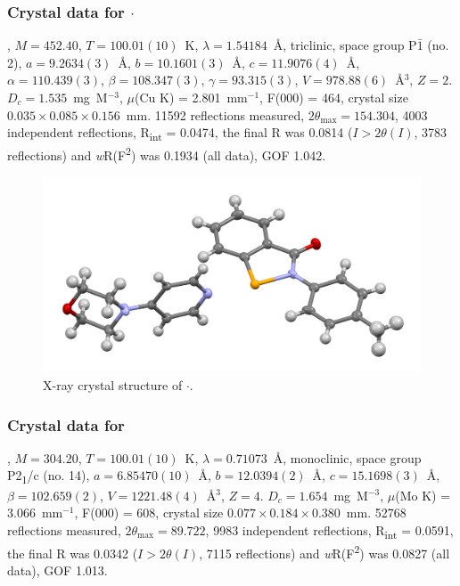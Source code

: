 \begin{refsection}
\subsubsection{Crystal data for \texorpdfstring{$ \cdot $}{C23 H23 N3 O2 Se}}
, $M=452.40$, $T=100.01(10)$~K, $\lambda=1.54184$~\AA, triclinic, space group P$\bar{1}$ (no. 2), $a = 9.2634(3)$~\AA, $b = 10.1601(3)$~\AA, $c = 11.9076(4)$~\AA, $\alpha = 110.439(3)$\degree, $\beta = 108.347(3)$\degree, $\gamma = 93.315(3)$\degree, $V = 978.88(6)$~\AA$^{3}$, $Z = 2$. $D_{c}= 1.535$~mg~M$^{-3}$, $\mu$(Cu K\a) = 2.801~mm$^{-1}$, F(000) = 464, crystal size $0.035 \times 0.085 \times 0.156$~mm. 11592 reflections measured, $2\theta_{\max}=154.304$\degree, 4003 independent reflections, R\textsubscript{int} = 0.0474, the final R was 0.0814 ($I > 2\theta(I)$, 3783 reflections) and \textit{w}R(F\textsuperscript{2}) was 0.1934 (all data), GOF 1.042.

\begin{figure}
  \includegraphics[width=0.6\linewidth]{Figures/ebs-4me-morph-xtal.pdf}
  \caption{X-ray crystal structure of \texorpdfstring{$ \cdot $}{C23 H23 N3 O2 Se}.}
\end{figure}

\subsubsection{Crystal data for \texorpdfstring{}{C14 H11 N O2 Se}}
, $M=304.20$, $T=100.01(10)$~K, $ \lambda=0.71073 $~\AA, monoclinic, space group P2\textsubscript{1}/c (no. 14), $a = 6.85470(10)$~\AA, $b = 12.0394(2)$~\AA, $c = 15.1698(3)$~\AA, $\beta = 102.659(2)$\degree, $V = 1221.48(4)$~\AA$^{3}$, $Z = 4$. $D_{c}= 1.654$~mg~M$^{-3}$, $\mu$(Mo K\a) = 3.066~mm$^{-1}$, F(000) = 608, crystal size $0.077 \times 0.184 \times 0.380$~mm. 52768 reflections measured, $2\theta_{\max}=89.722$\degree, 9983 independent reflections, R\textsubscript{int} = 0.0591, the final R was 0.0342 ($I > 2\theta(I)$, 7115 reflections) and \textit{w}R(F\textsuperscript{2}) was 0.0827 (all data), GOF 1.013.


\end{refsection}
